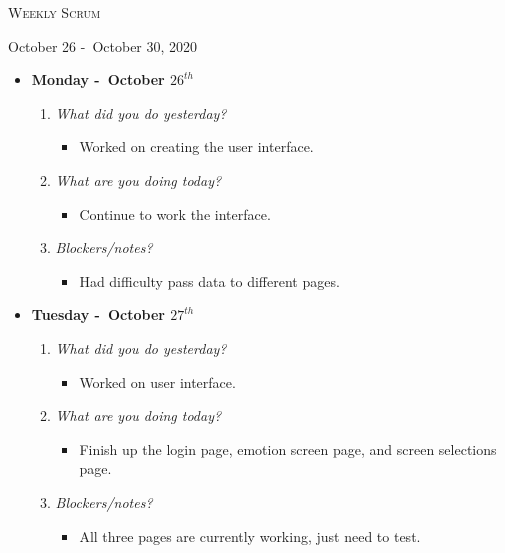 \centerline{\LARGE\textsc{Weekly Scrum}}
\centerline{October 26 -\ October 30, 2020}
\textbf{}
\begin{itemize}
  \item[] \textbf{\large Monday -\ October \(26^{th}\)}
  \begin{enumerate}
    \item \textsl{What did you do yesterday?}
    \begin{itemize}
      \item Worked on creating the user interface.
    \end{itemize}
    \item \textsl{What are you doing today?}
    \begin{itemize}
      \item Continue to work the interface.
    \end{itemize}
    \item \textsl{Blockers/notes?}
    \begin{itemize}
      \item Had difficulty pass data to different pages.
    \end{itemize}
  \end{enumerate}
\end{itemize}
\textbf{}
\begin{itemize}
  \item[] \textbf{\large Tuesday -\ October \(27^{th}\)}
  \begin{enumerate}
    \item \textsl{What did you do yesterday?}
    \begin{itemize}
      \item Worked on user interface.
    \end{itemize}
    \item \textsl{What are you doing today?}
    \begin{itemize}
      \item Finish up the login page, emotion screen page, and screen selections page.
    \end{itemize}
    \item \textsl{Blockers/notes?}
    \begin{itemize}
      \item All three pages are currently working, just need to test.
    \end{itemize}
  \end{enumerate}
\end{itemize}
\textbf{}
